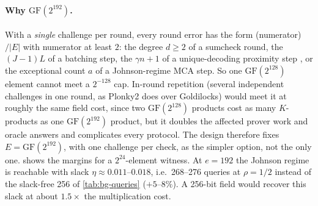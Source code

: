 \paragraph{Why $\mathrm{GF}(2^{192})$.} With a \emph{single} challenge per round, every round
error has the form (numerator)$/|E|$ with numerator at least $2$: the degree $d\ge2$ of a sumcheck
round, the $(J-1)L$ of a batching step, the $\gamma n+1$ of a unique-decoding proximity step
\cite[Cor.~1.4]{BCHKS25}, or the exceptional count $a$ of a Johnson-regime MCA step. So one
$\mathrm{GF}(2^{128})$ element cannot meet a $2^{-128}$ cap. In-round repetition (several
independent challenges in one  round, as Plonky2 does over Goldilocks) would meet it at
roughly the same field cost, since two $\mathrm{GF}(2^{128})$ products cost as many $K$-products as
one $\mathrm{GF}(2^{192})$ product, but it doubles the affected prover work and oracle answers and
complicates every protocol. The design therefore fixes $E=\mathrm{GF}(2^{192})$, with one challenge
per check, as the simpler option, not the only one.  shows the margins
for a $2^{24}$-element witness. At $e=192$ the Johnson regime is reachable with slack
$\eta\approx0.011$--$0.018$, i.e.\ 268--276 queries at $\rho=1/2$ instead of the slack-free 256 of
\cref{tab:bg-queries} ($+5$--$8\%$). A 256-bit field would recover this slack at about $1.5\times$
the multiplication cost.

